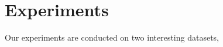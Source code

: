 \section{Experiments} \label{sec:experiment}

Our experiments are conducted on two interesting datasets, 
